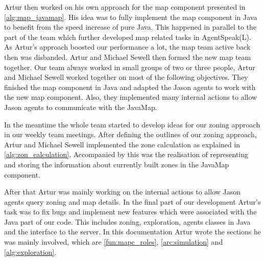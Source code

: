 Artur then worked on his own approach for the map component presented in \autoref{alg:map_javamap}.
His idea was to fully implement the map component in Java to benefit from the speed increase of pure Java.
This happened in parallel to the part of the team which further developed map related tasks in AgentSpeak(L).
As Artur's approach boosted our performance a lot, the map team active back then was disbanded.
Artur and Michael Sewell then formed the new map team together.
Our team always worked in small groups of two or three people, Artur and Michael Sewell worked together on most of the following objectives.
They finished the map component in Java and adapted the Jason agents to work with the new map component.
Also, they implemented many internal actions to allow Jason agents to communicate with the JavaMap.

In the meantime the whole team started to develop ideas for our zoning approach in our weekly team meetings.
After defining the outlines of our zoning approach, Artur and Michael Sewell implemented the zone calculation as explained in \autoref{alg:zon_calculation}.
Accompanied by this was the realisation of representing and storing the information about currently built zones in the JavaMap component.

After that Artur was mainly working on the internal actions to allow Jason agents query zoning and map details.
In the final part of our development Artur's task was to fix bugs and implement new features which were associated with the Java part of our code.
This includes zoning, exploration, agents classes in Java and the interface to the server.
In this documentation Artur wrote the sections he was mainly involved, which are \autoref{fun:mapc_roles}, \autoref{arc:simulation} and \autoref{alg:exploration}.
